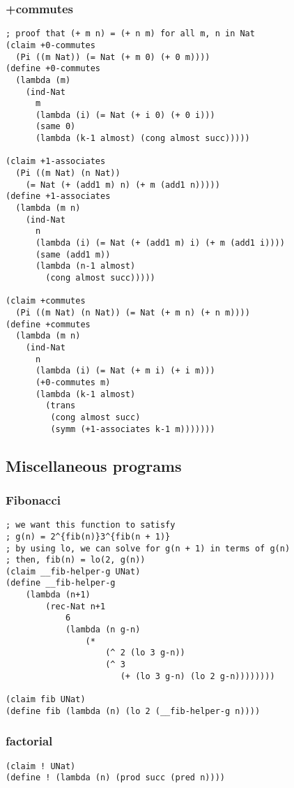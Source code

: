 \subsubsection{+commutes} \label{code:+commutes}
\begin{verbatim}
; proof that (+ m n) = (+ n m) for all m, n in Nat
(claim +0-commutes
  (Pi ((m Nat)) (= Nat (+ m 0) (+ 0 m))))
(define +0-commutes
  (lambda (m)
    (ind-Nat
      m
      (lambda (i) (= Nat (+ i 0) (+ 0 i)))
      (same 0)
      (lambda (k-1 almost) (cong almost succ)))))

(claim +1-associates
  (Pi ((m Nat) (n Nat))
    (= Nat (+ (add1 m) n) (+ m (add1 n)))))
(define +1-associates
  (lambda (m n)
    (ind-Nat
      n
      (lambda (i) (= Nat (+ (add1 m) i) (+ m (add1 i))))
      (same (add1 m))
      (lambda (n-1 almost)
        (cong almost succ)))))

(claim +commutes
  (Pi ((m Nat) (n Nat)) (= Nat (+ m n) (+ n m))))
(define +commutes
  (lambda (m n)
    (ind-Nat
      n
      (lambda (i) (= Nat (+ m i) (+ i m)))
      (+0-commutes m)
      (lambda (k-1 almost)
        (trans
         (cong almost succ)
         (symm (+1-associates k-1 m)))))))
\end{verbatim}


\subsection{Miscellaneous programs}

\subsubsection{Fibonacci} \label{code:Fibonacci}
\begin{verbatim}
; we want this function to satisfy
; g(n) = 2^{fib(n)}3^{fib(n + 1)}
; by using lo, we can solve for g(n + 1) in terms of g(n)
; then, fib(n) = lo(2, g(n))
(claim __fib-helper-g UNat)
(define __fib-helper-g
    (lambda (n+1)
        (rec-Nat n+1
            6
            (lambda (n g-n) 
                (*
                    (^ 2 (lo 3 g-n))
                    (^ 3
                       (+ (lo 3 g-n) (lo 2 g-n))))))))

(claim fib UNat)
(define fib (lambda (n) (lo 2 (__fib-helper-g n))))
\end{verbatim}

\subsubsection{factorial} \label{code:factorial}
\begin{verbatim}
(claim ! UNat)
(define ! (lambda (n) (prod succ (pred n))))
\end{verbatim}

